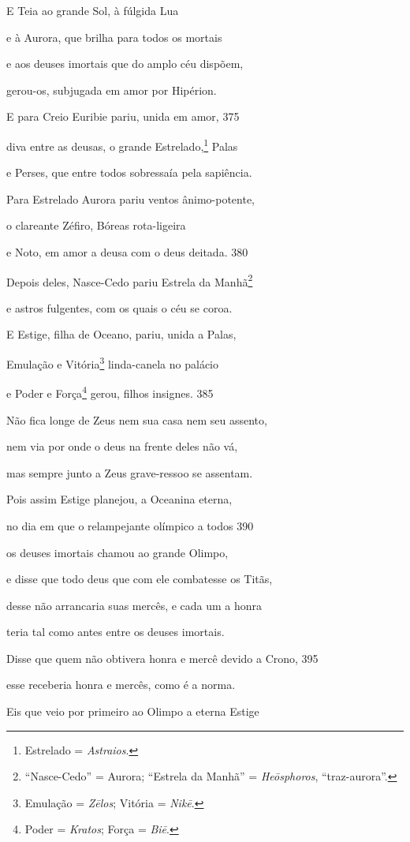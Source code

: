 \quad{}E Teia ao grande Sol, à fúlgida Lua

e à Aurora, que brilha para todos os mortais

e aos deuses imortais que do amplo céu dispõem,

gerou-os, subjugada em amor por Hipérion.

E para Creio Euribie pariu, unida em amor, \num{375}

diva entre as deusas, o grande Estrelado,\footnote{Estrelado = \emph{Astraios}.} Palas

e Perses, que entre todos sobressaía pela sapiência.

Para Estrelado Aurora pariu ventos ânimo-potente,

o clareante Zéfiro, Bóreas rota-ligeira

e Noto, em amor a deusa com o deus deitada. \num{380}

Depois deles, Nasce-Cedo pariu Estrela da Manhã\footnote{``Nasce-Cedo'' = Aurora; ``Estrela da Manhã'' = \emph{Heōsphoros}, ``traz-aurora''.}

e astros fulgentes, com os quais o céu se coroa.

\quad{}E Estige, filha de Oceano, pariu, unida a Palas,

Emulação e Vitória\footnote{Emulação = \emph{Zēlos}; Vitória = \emph{Nikē}.} linda-canela no palácio

e Poder e Força\footnote{Poder = \emph{Kratos}; Força = \emph{Biē}.} gerou, filhos insignes. \num{385}

Não fica longe de Zeus nem sua casa nem seu assento,

nem via por onde o deus na frente deles não vá,

mas sempre junto a Zeus grave-ressoo se assentam.

Pois assim Estige planejou, a Oceanina eterna,

no dia em que o relampejante olímpico a todos \num{390}

os deuses imortais chamou ao grande Olimpo,

e disse que todo deus que com ele combatesse os Titãs,

desse não arrancaria suas mercês, e cada um a honra

teria tal como antes entre os deuses imortais.

Disse que quem não obtivera honra e mercê devido a Crono, \num{395}

esse receberia honra e mercês, como é a norma.

Eis que veio por primeiro ao Olimpo a eterna Estige


